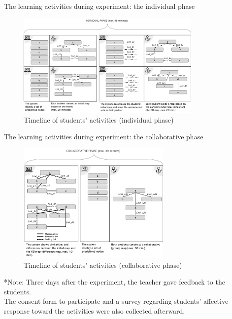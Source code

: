 \begin{frame}{The learning activities during experiment: the individual phase}
    \begin{figure}[tb]
        \begin{center}
            \includegraphics[width=90mm]{images/method_ind_phase_RKB.pdf}
        \end{center}
        \caption{Timeline of students' activities (individual phase)}
        \label{method::rkb_ind_phase}
    \end{figure}
    
\end{frame}
\begin{frame}{The learning activities during experiment: the collaborative phase}
    \begin{figure}[tb]
        \begin{center}
            \includegraphics[width=75mm]{images/method_collab_phase_RKB.pdf}
        \end{center}
        \caption{Timeline of students' activities (collaborative phase)}
        \label{intro::rkb_collab_phase}
    \end{figure}
    {\tiny **Note: Three days after the experiment, the teacher gave feedback to the students. \\
    The consent form to participate and a survey regarding students' affective response
    toward the activities were also collected afterward. }

\end{frame}
    
